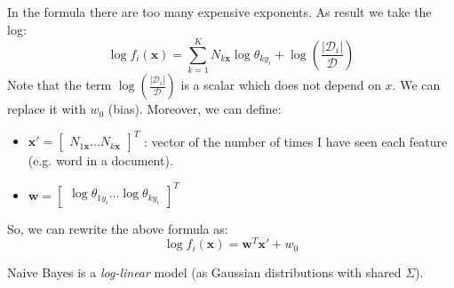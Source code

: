 In the formula there are too many expensive exponents. As result we take the log:
\begin{equation*}
    \log{f_i(\pmb{x})} = \sum_{k=1}^K N_{k \pmb{x}} \log{\theta_{k y_i}} + \log{(\frac{|\mathcal{D}_i|}{\mathcal{D}})}
\end{equation*}
Note that the term $\log{(\frac{|\mathcal{D}_i|}{\mathcal{D}})}$ is a scalar which does not depend on $x$. We can replace it with $w_0$ (bias). Moreover, we can define:
\begin{itemize}
    \item $\pmb{x}' = \begin{bmatrix} N_{1 \pmb{x}} \hdots N_{k \pmb{x}} \end{bmatrix}^T$ : vector of the number of times I have seen each feature (e.g. word in a document).
    
    \item $\pmb{w} = \begin{bmatrix} \log{\theta_{1 y_i}} \hdots \log{\theta_{k y_i}}\end{bmatrix}^T$
\end{itemize}

So, we can rewrite the above formula as:
$$\log{f_i(\pmb{x})} = \pmb{w}^T \pmb{x}' + w_0$$

Naive Bayes is a \textit{log-linear} model (as Gaussian distributions with shared $\Sigma$).